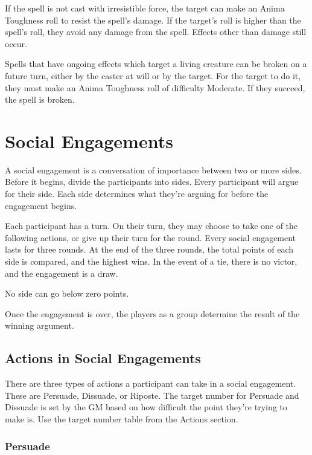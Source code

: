 \begin{multicols}{2}
If the spell is not cast with irresistible force, the target can make an Anima Toughness roll to resist
the spell's damage. If the target's roll is higher than the spell's roll, they avoid
any damage from the spell. Effects other than damage still occur.

Spells that have ongoing effects which target a living creature can be broken on a future turn, either by
the caster at will or by the target. For the target to do it, they must make an Anima Toughness roll of
difficulty Moderate. If they succeed, the spell is broken.

\section{Social Engagements}

A social engagement is a conversation of importance between two or more sides. Before it begins,
divide the participants into sides. Every participant will argue for their side. Each side
determines what they're arguing for before the engagement begins.

Each participant has a turn. On their turn, they may choose to take one of the
following actions, or give up their turn for the round. Every social engagement
lasts for three rounds. At the end of the three rounds, the total points of each
side is compared, and the highest wins. In the event of a tie, there is no
victor, and the engagement is a draw.

No side can go below zero points.

Once the engagement is over, the players as a group determine the result of the winning argument.

\subsection{Actions in Social Engagements}

There are three types of actions a participant can take in a social engagement.
These are Persuade, Dissuade, or Riposte. The target number for Persuade and
Dissuade is set by the GM based on how difficult the point they're trying to
make is. Use the target number table from the Actions section.

\subsubsection{Persuade}


\end{multicols}
